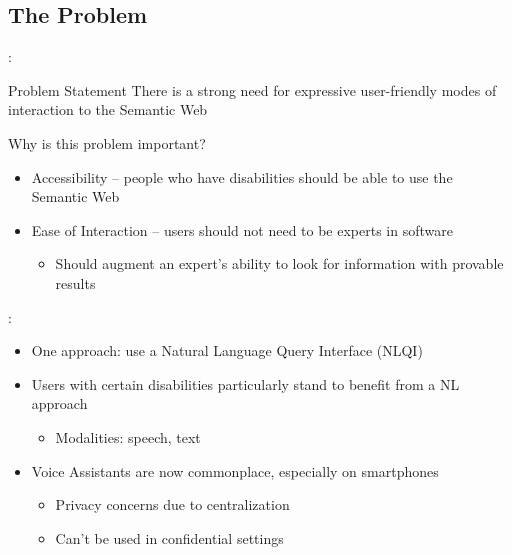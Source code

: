 \documentclass[logoontitle,tabu,supertabular,aspectratio=43]{preney-uwindsor-beamer}
\begin{document}
    \subsection{The Problem}
    \begin{frame}{\insertsection: \insertsubsection}

        \begin{block}{Problem Statement}
            There is a strong need for expressive user-friendly modes of interaction to the Semantic Web %
        \end{block}

        Why is this problem important?
        \begin{itemize}
            \item Accessibility -- people who have disabilities should be able to use the Semantic Web
            \item Ease of Interaction -- users should not need to be experts in software
            \begin{itemize}
                \item Should augment an expert's ability to look for information with provable results
            \end{itemize}
        \end{itemize}

    \end{frame}

    \begin{frame}{\insertsection: \insertsubsection}
    \begin{itemize}
        \item One approach: use a Natural Language Query Interface (NLQI)
        \item Users with certain disabilities particularly stand to benefit from a NL approach
        \begin{itemize}
            \item Modalities: speech, text
        \end{itemize}
        \item Voice Assistants are now commonplace, especially on smartphones
        \begin{itemize}
            \item Privacy concerns due to centralization
            \item Can't be used in confidential settings
        \end{itemize}
    \end{itemize}
    \end{frame}
\end{document}
